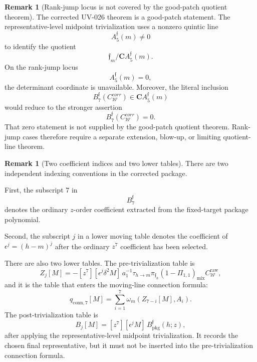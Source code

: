 \documentclass[11pt,a4paper]{amsart}
\def\corr{corr}%
\theoremstyle{plain}
\theoremstyle{definition}
\newtheorem{remark}[theorem]{Remark}
\newcommand{\corr}{\mathrm{corr}}
\begin{document}
\begin{remark}[Rank-jump locus is not covered by the good-patch quotient theorem]
\label{rem:rank-jump-locus-not-covered-uv026}
The corrected UV-026 theorem is a good-patch statement.  The
representative-level midpoint trivialization uses a nonzero quintic line
\[
A_5^{\mathfrak f}(m)\ne0
\]
to identify the quotient
\[
\mathfrak f_m/\mathbf C A_5^{\mathfrak f}(m).
\]
On the rank-jump locus
\[
A_5^{\mathfrak f}(m)=0,
\]
the determinant coordinate is unavailable.  Moreover, the literal inclusion
\[
B_7^{\mathfrak f}(C_{\mathcal W}^{\corr})
\in
\mathbf C A_5^{\mathfrak f}(m)
\]
would reduce to the stronger assertion
\[
B_7^{\mathfrak f}(C_{\mathcal W}^{\corr})=0.
\]
That zero statement is not supplied by the good-patch quotient theorem.
Rank-jump cases therefore require a separate extension, blow-up, or limiting
quotient-line theorem.
\end{remark}

\begin{remark}[Two coefficient indices and two lower tables]
\label{rem:two-coefficient-indices-package}
There are two independent indexing conventions in the corrected package.

First, the subscript \(7\) in
\[
B_7^{\mathfrak f}
\]
denotes the ordinary \(z\)-order coefficient extracted from the fixed-target
package polynomial.

Second, the subscript \(j\) in a lower moving table denotes the coefficient
of \(\epsilon^j=(h-m)^j\) after the ordinary \(z^7\) coefficient has been
selected.

There are also two lower tables.  The pre-trivialization table is
\[
Z_j[M]
=
-[z^7][\epsilon^j\delta^2M]\,
a_1^{-1}\tau_{h\to m}
\pi_{\mathfrak f_h}
(1-\Pi_{1,1})_{\mathrm{mix}}C_{\mathcal W}^{\mathrm{raw}},
\]
and it is the table that enters the moving-line connection formula:
\[
q_{\mathrm{conn},7}[M]
=
\sum_{i=1}^{7}\omega_m(Z_{7-i}[M],A_i).
\]
The post-trivialization table is
\[
B_j[M]=[z^7][\epsilon^jM]\,B_{\mathrm{pkg}}^{\mathfrak f}(h;z),
\]
after applying the representative-level midpoint trivialization.  It records
the chosen final representative, but it must not be inserted into the
pre-trivialization connection formula.
\end{remark}
\end{document}
